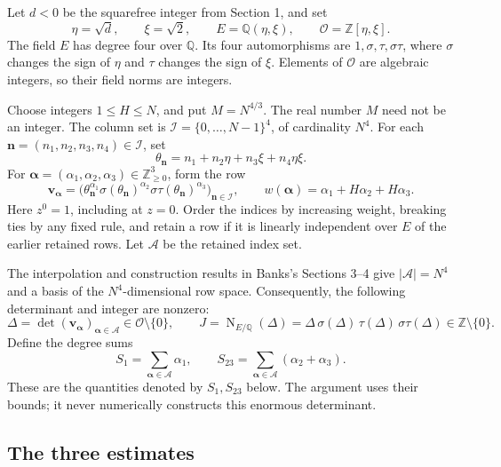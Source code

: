 \documentclass[11pt]{article}
\newcommand{\Z}{\mathbb Z}
\newcommand{\Q}{\mathbb Q}
\begin{document}
Let \(d<0\) be the squarefree integer from Section 1, and set
\[
 \eta=\sqrt d,\qquad \xi=\sqrt2,\qquad
 E=\Q(\eta,\xi),\qquad \mathcal O=\Z[\eta,\xi].
\]
The field \(E\) has degree four over \(\Q\). Its four automorphisms
are \(1,\sigma,\tau,\sigma\tau\), where \(\sigma\) changes the sign
of \(\eta\) and \(\tau\) changes the sign of \(\xi\). Elements of
\(\mathcal O\) are algebraic integers, so their field norms are integers.

Choose integers \(1\le H\le N\), and put \(M=N^{4/3}\). The real number
\(M\) need not be an integer. The column set is
\(\mathcal I=\{0,\ldots,N-1\}^4\), of cardinality \(N^4\). For each
\(\boldsymbol n=(n_1,n_2,n_3,n_4)\in\mathcal I\), set
\[
 \theta_{\boldsymbol n}
 =n_1+n_2\eta+n_3\xi+n_4\eta\xi.
\]
For \(\boldsymbol\alpha=(\alpha_1,\alpha_2,\alpha_3)
\in\Z_{\ge0}^3\), form the row
\[
 \boldsymbol v_{\boldsymbol\alpha}
 =\bigl(\theta_{\boldsymbol n}^{\alpha_1}
       \sigma(\theta_{\boldsymbol n})^{\alpha_2}
       \sigma\tau(\theta_{\boldsymbol n})^{\alpha_3}
   \bigr)_{\boldsymbol n\in\mathcal I},
 \qquad
 w(\boldsymbol\alpha)=\alpha_1+H\alpha_2+H\alpha_3.
\]
Here \(z^0=1\), including at \(z=0\). Order the indices by increasing
weight, breaking ties by any fixed rule, and retain a row if it is
linearly independent over \(E\) of the earlier retained rows.
Let \(\mathcal A\) be the retained index set.

The interpolation and construction results in Banks's Sections 3--4
give \(|\mathcal A|=N^4\) and a basis of the \(N^4\)-dimensional row
space. Consequently, the following determinant and integer are nonzero:
\[
 \Delta=\det(\boldsymbol v_{\boldsymbol\alpha})_{\boldsymbol\alpha\in\mathcal A}
       \in\mathcal O\setminus\{0\},\qquad
 J=\operatorname{N}_{E/\Q}(\Delta)
   =\Delta\,\sigma(\Delta)\,\tau(\Delta)\,\sigma\tau(\Delta)
       \in\Z\setminus\{0\}.
\]
Define the degree sums
\[
 S_1=\sum_{\boldsymbol\alpha\in\mathcal A}\alpha_1,\qquad
 S_{23}=\sum_{\boldsymbol\alpha\in\mathcal A}(\alpha_2+\alpha_3).
\]
These are the quantities denoted by \(S_1,S_{23}\) below.
The argument uses their bounds; it never numerically constructs this
enormous determinant.

\subsection{The three estimates}
\end{document}
